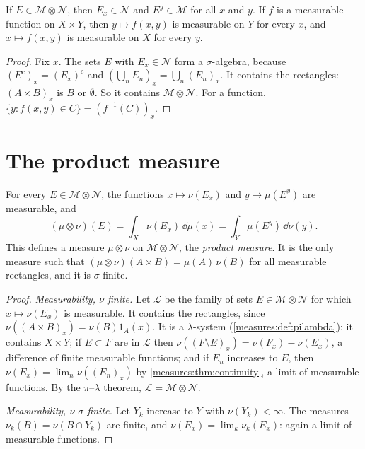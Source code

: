 \begin{notechapter}
\begin{lemma}\label{fubini:lem:sections}
If $E\in\mathcal M\otimes\mathcal N$, then $E_x\in\mathcal N$ and
$E^y\in\mathcal M$ for all $x$ and $y$. If $f$ is a measurable function
on $X\times Y$, then $y\mapsto f(x, y)$ is measurable on $Y$ for every
$x$, and $x\mapsto f(x, y)$ is measurable on $X$ for every $y$.
\end{lemma}

\begin{proof}
Fix $x$. The sets $E$ with $E_x\in\mathcal N$ form a $\sigma$-algebra,
because $(E^c)_x = (E_x)^c$ and
$(\bigcup_nE_n)_x = \bigcup_n(E_n)_x$. It contains the rectangles:
$(A\times B)_x$ is $B$ or $\emptyset$. So it contains
$\mathcal M\otimes\mathcal N$. For a function,
$\{y : f(x, y)\in C\} = (f^{-1}(C))_x$.
\end{proof}

\section{The product measure}\label{fubini:sec:measure}

\begin{theorem}\label{fubini:thm:product}
For every $E\in\mathcal M\otimes\mathcal N$, the functions
$x\mapsto\nu(E_x)$ and $y\mapsto\mu(E^y)$ are measurable, and
\[
  (\mu\otimes\nu)(E) = \int_X\nu(E_x)\,\dd\mu(x)
  = \int_Y\mu(E^y)\,\dd\nu(y) .
\]
This defines a measure $\mu\otimes\nu$ on $\mathcal M\otimes\mathcal N$,
the \emph{product measure}. It is the only measure such that
$(\mu\otimes\nu)(A\times B) = \mu(A)\,\nu(B)$ for all measurable
rectangles, and it is $\sigma$-finite.
\end{theorem}

\begin{proof}
\emph{Measurability, $\nu$ finite.} Let $\mathcal L$ be the family of
sets $E\in\mathcal M\otimes\mathcal N$ for which $x\mapsto\nu(E_x)$ is
measurable. It contains the rectangles, since
$\nu((A\times B)_x) = \nu(B)1_A(x)$. It is a $\lambda$-system
(\cref{measures:def:pilambda}): it contains $X\times Y$; if $E\subset F$
are in $\mathcal L$ then $\nu((F\setminus E)_x) = \nu(F_x) - \nu(E_x)$,
a difference of finite measurable functions; and if $E_n$ increases to
$E$, then $\nu(E_x) = \lim_n\nu((E_n)_x)$ by
\cref{measures:thm:continuity}, a limit of measurable functions. By the
$\pi$--$\lambda$ theorem, $\mathcal L = \mathcal M\otimes\mathcal N$.

\emph{Measurability, $\nu$ $\sigma$-finite.} Let $Y_k$ increase to $Y$
with $\nu(Y_k) < \infty$. The measures $\nu_k(B) = \nu(B\cap Y_k)$ are
finite, and $\nu(E_x) = \lim_k\nu_k(E_x)$: again a limit of measurable
functions.


\end{proof}
\end{notechapter}
